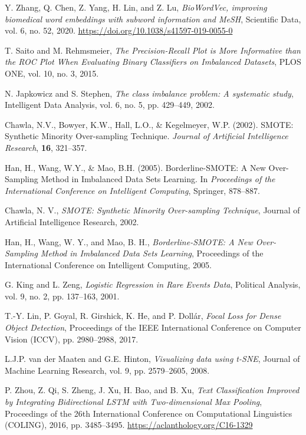 \documentclass[12pt]{report}
\begin{document}
\begin{thebibliography}{99}
Y. Zhang, Q. Chen, Z. Yang, H. Lin, and Z. Lu, 
\textit{BioWordVec, improving biomedical word embeddings with subword information and MeSH}, 
Scientific Data, vol. 6, no. 52, 2020. 
\url{https://doi.org/10.1038/s41597-019-0055-0}

T. Saito and M. Rehmsmeier, 
\textit{The Precision-Recall Plot is More Informative than the ROC Plot When Evaluating Binary Classifiers on Imbalanced Datasets}, 
PLOS ONE, vol. 10, no. 3, 2015.

N. Japkowicz and S. Stephen, 
\textit{The class imbalance problem: A systematic study}, 
Intelligent Data Analysis, vol. 6, no. 5, pp. 429–449, 2002.

Chawla, N.V., Bowyer, K.W., Hall, L.O., \& Kegelmeyer, W.P. (2002).
SMOTE: Synthetic Minority Over-sampling Technique.
\textit{Journal of Artificial Intelligence Research}, \textbf{16}, 321--357.

Han, H., Wang, W.Y., \& Mao, B.H. (2005).
Borderline-SMOTE: A New Over-Sampling Method in Imbalanced Data Sets Learning.
In \textit{Proceedings of the International Conference on Intelligent Computing}, Springer, 878--887.

 Chawla, N. V., \textit{SMOTE: Synthetic Minority Over-sampling Technique}, Journal of Artificial Intelligence Research, 2002.

 Han, H., Wang, W. Y., and Mao, B. H., \textit{Borderline-SMOTE: A New Over-Sampling Method in Imbalanced Data Sets Learning}, Proceedings of the International Conference on Intelligent Computing, 2005.

G. King and L. Zeng, 
\textit{Logistic Regression in Rare Events Data}, 
Political Analysis, vol. 9, no. 2, pp. 137–163, 2001.

T.-Y. Lin, P. Goyal, R. Girshick, K. He, and P. Dollár,
\textit{Focal Loss for Dense Object Detection}, 
Proceedings of the IEEE International Conference on Computer Vision (ICCV), pp. 2980–2988, 2017.

L.J.P. van der Maaten and G.E. Hinton,
\textit{Visualizing data using t-SNE},
Journal of Machine Learning Research, vol. 9, pp. 2579–2605, 2008.

P. Zhou, Z. Qi, S. Zheng, J. Xu, H. Bao, and B. Xu, 
\textit{Text Classification Improved by Integrating Bidirectional LSTM with Two-dimensional Max Pooling}, 
Proceedings of the 26th International Conference on Computational Linguistics (COLING), 2016, pp. 3485–3495. 
\url{https://aclanthology.org/C16-1329}


\end{thebibliography}
\end{document}
